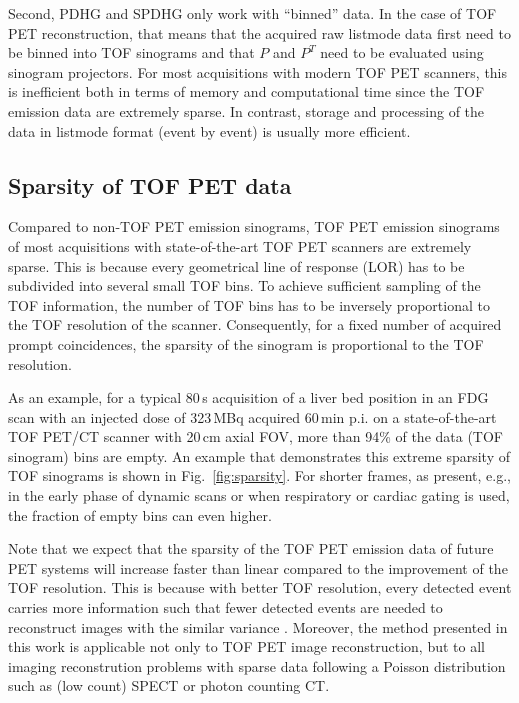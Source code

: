 Second, PDHG and SPDHG only work with ``binned'' data.
In the case of TOF PET reconstruction, that means that the acquired raw listmode data first need to be
binned into TOF sinograms and that $P$ and $P^T$ need to be evaluated using
sinogram projectors.
For most acquisitions with modern TOF PET scanners, this is inefficient both in terms of memory and
computational time since the TOF emission data are extremely sparse.
In contrast, storage and processing of the data in listmode format (event by event) is usually 
more efficient.

\subsection*{Sparsity of TOF PET data}

Compared to non-TOF PET emission sinograms, TOF PET emission sinograms of most acquisitions
with state-of-the-art TOF PET scanners are extremely sparse.
This is because every geometrical line of response (LOR) has to be subdivided into
several small TOF bins.
To achieve sufficient sampling of the TOF information, the number of TOF bins has to be
inversely proportional to the TOF resolution of the scanner. 
Consequently, for a fixed number of acquired prompt coincidences, the sparsity of the
sinogram is proportional to the TOF resolution.

As an example, for a typical 80\,s acquisition of a liver bed position in an FDG scan with 
an injected dose of 323\,MBq acquired 60\,min p.i. on a state-of-the-art TOF PET/CT scanner with
20\,cm axial FOV, more than 94\% of the data (TOF sinogram) bins are empty.
An example that demonstrates this extreme sparsity of TOF sinograms is shown in Fig.~\ref{fig:sparsity}.
For shorter frames, as present, e.g., in the early phase of dynamic scans or when respiratory
or cardiac gating is used, the fraction of empty bins can even higher.

Note that we expect that the sparsity of the TOF PET emission data of future PET systems will increase 
faster than linear compared to the improvement of the TOF resolution.
This is because with better TOF resolution, every detected event carries more information such
that fewer detected events are needed to reconstruct images with the similar 
variance \cite{Tomitani1981}.
Moreover, the method presented in this work is applicable not only to TOF PET image reconstruction,
but to all imaging reconstrution problems with sparse data following a Poisson distribution
such as (low count) SPECT or photon counting CT.

